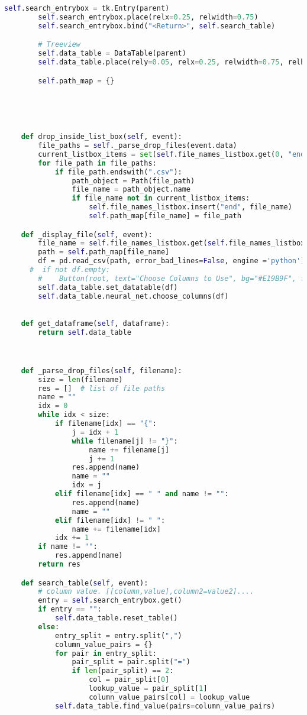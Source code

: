 \documentclass[12pt,letterpaper,oneside,reqno]{book}
\theoremstyle{plain}
\theoremstyle{definition}
\theoremstyle{plain}
\theoremstyle{remark}
\theoremstyle{plain}
\theoremstyle{definition}
\theoremstyle{plain}
\begin{document}
\begin{appendices}
\begin{lstlisting}[language=Python, label=lst:guifull, frame=single]
        self.search_entrybox = tk.Entry(parent)
        self.search_entrybox.place(relx=0.25, relwidth=0.75)
        self.search_entrybox.bind("<Return>", self.search_table)

        # Treeview
        self.data_table = DataTable(parent)
        self.data_table.place(rely=0.05, relx=0.25, relwidth=0.75, relheight=0.45)

        self.path_map = {}

        

        

    def drop_inside_list_box(self, event):
        file_paths = self._parse_drop_files(event.data)
        current_listbox_items = set(self.file_names_listbox.get(0, "end"))
        for file_path in file_paths:
            if file_path.endswith(".csv"):
                path_object = Path(file_path)
                file_name = path_object.name
                if file_name not in current_listbox_items:
                    self.file_names_listbox.insert("end", file_name)
                    self.path_map[file_name] = file_path

    def _display_file(self, event):
        file_name = self.file_names_listbox.get(self.file_names_listbox.curselection())
        path = self.path_map[file_name]
        df = pd.read_csv(path, error_bad_lines=False, engine ='python')
      #  if not df.empty:
        #    Button(root, text="Choose Columns to Use", bg="#E19B9F", fg="white", command=null).pack(side=BOTTOM)
        self.data_table.set_datatable(df)
        self.data_table.neural_net.choose_columns(df)

    
    def get_dataframe(self, dataframe):
        return self.data_table



    def _parse_drop_files(self, filename):
        size = len(filename)
        res = []  # list of file paths
        name = ""
        idx = 0
        while idx < size:
            if filename[idx] == "{":
                j = idx + 1
                while filename[j] != "}":
                    name += filename[j]
                    j += 1
                res.append(name)
                name = ""
                idx = j
            elif filename[idx] == " " and name != "":
                res.append(name)
                name = ""
            elif filename[idx] != " ":
                name += filename[idx]
            idx += 1
        if name != "":
            res.append(name)
        return res

    def search_table(self, event):
        # column value. [[column,value],column2=value2]....
        entry = self.search_entrybox.get()
        if entry == "":
            self.data_table.reset_table()
        else:
            entry_split = entry.split(",")
            column_value_pairs = {}
            for pair in entry_split:
                pair_split = pair.split("=")
                if len(pair_split) == 2:
                    col = pair_split[0]
                    lookup_value = pair_split[1]
                    column_value_pairs[col] = lookup_value
            self.data_table.find_value(pairs=column_value_pairs)



\end{lstlisting}
\end{appendices}
\end{document}

